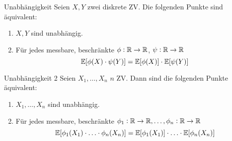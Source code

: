 \begin{theorem}{Unabhängigkeit}
	Seien $X,Y$ zwei diskrete ZV. Die folgenden Punkte sind äquivalent:
	\begin{enumerate}
		\item $X,Y$ sind unabhängig.
		\item Für jedes messbare, beschränkte $\phi: \mathbb{R} \rightarrow \mathbb{R}$, $\psi : \mathbb{R} \rightarrow \mathbb{R}$
			\begin{equation*}
				\mathbb{E} [\phi (X) \cdot \psi (Y)] = \mathbb{E} [\phi (X)] \cdot \mathbb{E} [\psi (Y)]
			\end{equation*}
	\end{enumerate}
\end{theorem}
\begin{theorem}{Unabhängigkeit 2}
	Seien $X_1 , \ldots , X_n$ $n$ ZV. Dann sind die folgenden Punkte äquivalent:
	\begin{enumerate}
		\item $X_1 , \ldots , X_n$ sind unabhängig.
		\item Für jedes messbare, beschränkte $\phi_1 :\mathbb{R} \rightarrow \mathbb{R}, \ldots , \phi_n : \mathbb{R} \rightarrow \mathbb{R}$
			\begin{equation*}
				\mathbb{E} [\phi_1 (X_1) \cdot \ldots \cdot \phi_n (X_n)] = \mathbb{E} [\phi_1 (X_1)] \cdot \ldots \cdot \mathbb{E} [\phi_n (X_n)]
			\end{equation*}
	\end{enumerate}
\end{theorem}

